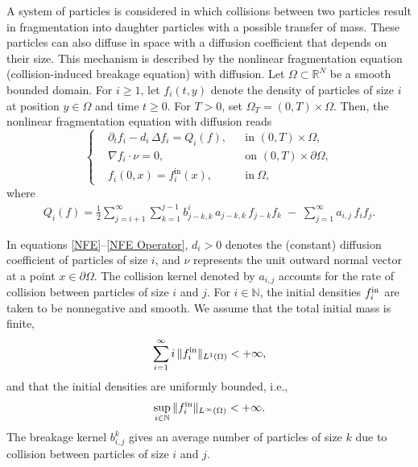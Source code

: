 \documentclass[a4paper,12pt,reqno]{amsart}
\theoremstyle{plain}
\numberwithin{equation}{section}
\begin{document}
	A system of particles is considered in which collisions between two particles result in fragmentation into daughter particles with a possible transfer of mass. These particles can also diffuse in space with a diffusion coefficient that depends on their size. This mechanism is described by the nonlinear fragmentation equation (collision-induced breakage equation) with diffusion. Let $\Omega \subset \mathbb{R}^N$ be a smooth bounded domain. For $i \ge 1$, let $f_i(t,y)$ denote the density of particles of size $i$ at position $y \in \Omega$ and time $t \ge 0$. For $T>0$, set $\Omega_T = (0,T)\times\Omega$. Then, the nonlinear fragmentation equation with diffusion reads
	\begin{equation}
		\left\{
		\begin{aligned}
			& \partial_t f_i - d_i\, \Delta f_i = Q_i(f), && \text{in } (0,T)\times \Omega, \\
			& \nabla{f_i}\cdot \nu = 0, && \text{on } (0,T)\times \partial\Omega, \\
			& f_i(0,x) = f_i^{\mathrm{in}}(x), && \mbox{in}\  \Omega,
		\end{aligned}
		\right. \label{NFE}
	\end{equation}
	where
	\begin{align} 
		Q_i(f)
		= 
		\frac12 \sum_{j=i+1}^{\infty}\sum_{k=1}^{j-1}
		b_{j-k,k}^i\, a_{j-k,k}\, f_{j-k} f_k
		\;-\;
		\sum_{j=1}^{\infty} a_{i,j}\, f_i f_j. \label{NFE Operator}
	\end{align}
	
	In equations \eqref{NFE}–\eqref{NFE Operator}, $d_i>0$ denotes the (constant) diffusion coefficient of particles of size $i$, and $\nu$ represents the unit outward normal vector at a point $x\in\partial\Omega$. The collision kernel denoted by $a_{i,j}$ accounts for the rate of collision between particles of size $i$ and $j$. For $i\in\mathbb{N}$, the initial densities $f_i^{\rm{in}}$ are taken to be nonnegative and smooth. We assume that the total initial mass is finite,
	\begin{align}
		\sum_{i=1}^{\infty} i \, \| f_i^{\rm in} \|_{L^1(\Omega)} < +\infty, \label{IC mass finite}
	\end{align}
	and that the initial densities are uniformly bounded, i.e.,
	\begin{align}
		\sup_{i \in \mathbb{N}} \| f_i^{\rm in} \|_{L^\infty(\Omega)} < +\infty. \label{IC uniform boundedness}
	\end{align}
	The breakage kernel $b^k_{i,j}$ gives an average number of particles of size $k$ due to collision between particles of size $i$ and $j$. 
	
\end{document}
